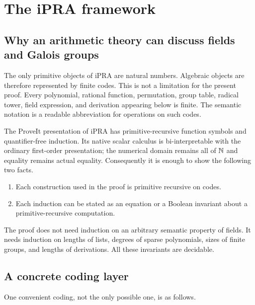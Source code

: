 \section{The iPRA framework}
\label{sec:ipra-framework}

\subsection{Why an arithmetic theory can discuss fields and Galois groups}

The only primitive objects of iPRA are natural numbers.  Algebraic objects are
therefore represented by finite codes.  This is not a limitation for the
present proof.  Every polynomial, rational function, permutation, group table,
radical tower, field expression, and derivation appearing below is finite.
The semantic notation is a readable abbreviation for operations on such
codes.

The ProveIt presentation of iPRA has primitive-recursive function symbols and
quantifier-free induction.  Its native scalar calculus is bi-interpretable
with the ordinary first-order presentation; the numerical domain remains all
of $\mathbb N$ and equality remains actual equality.  Consequently it is enough to
show the following two facts.

\begin{enumerate}
\item Each construction used in the proof is primitive recursive on codes.
\item Each induction can be stated as an equation or a Boolean invariant about
  a primitive-recursive computation.
\end{enumerate}

The proof does not need induction on an arbitrary semantic property of fields.
It needs induction on lengths of lists, degrees of sparse polynomials, sizes of
finite groups, and lengths of derivations.  All these invariants are decidable.

\subsection{A concrete coding layer}

One convenient coding, not the only possible one, is as follows.


